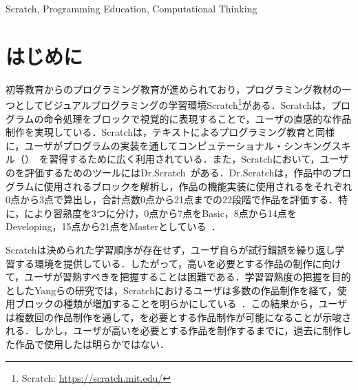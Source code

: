 \documentclass[submit]{ipsj}
\begin{document}
\begin{ekeyword}
Scratch, Programming Education, Computational Thinking
\end{ekeyword}

\maketitle


\section{はじめに}\label{sec:intro}
初等教育からのプログラミング教育が進められており，プログラミング教材の一つとしてビジュアルプログラミングの学習環境Scratch\footnote{Scratch: \url{https://scratch.mit.edu/}}がある．Scratchは，プログラムの命令処理をブロックで視覚的に表現することで，ユーザの直感的な作品制作を実現している．Scratchは，テキストによるプログラミング教育と同様に，ユーザがプログラムの実装を通してコンピュテーショナル・シンキングスキル（\textcolor{red}{}）~\cite{Wing_2006}を習得するために広く利用されている．また，Scratchにおいて，ユーザの\textcolor{red}{}を評価するためのツールにはDr.Scratch~\cite{Moreno_2015}がある．Dr.Scratchは，作品中のプログラムに使用されるブロックを解析し，作品の機能実装に使用される\textcolor{red}{}をそれぞれ0点から3点で算出し，合計点数0点から21点までの22段階\textcolor{red}{}で作品を評価する．特に，\textcolor{red}{}により習熟度を3つに分け，0点から7点をBasic，8点から14点をDeveloping，15点から21点をMasterとしている~\cite{Moreno_2015_analyze}．

Scratchは決められた学習順序が存在せず，ユーザ自らが試行錯誤を繰り返し学習する環境を提供している．したがって，高い\textcolor{red}{}を必要とする作品の制作に向けて，ユーザが習熟すべき\textcolor{red}{}を把握することは困難である．学習習熟度の把握を目的としたYangらの研究では，Scratchにおけるユーザは多数の作品制作を経て，使用ブロックの種類が増加することを明らかにしている~\cite{Yang_2015}．この結果から，ユーザは複数回の作品制作を通して，\textcolor{red}{}を必要とする作品制作が可能になることが示唆される．しかし，ユーザが高い\textcolor{red}{}を必要とする作品を制作するまでに，過去に制作した作品で使用した\textcolor{red}{}は明らかではない．
\end{document}
